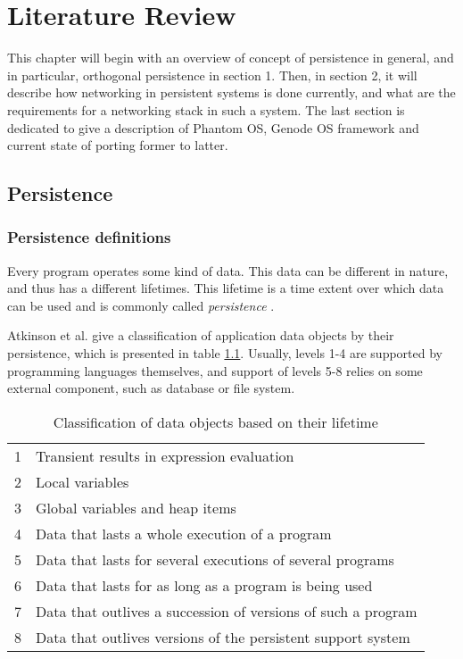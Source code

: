 \chapter{Literature Review}
\label{chap:lr}

This chapter will begin with an overview of concept of persistence in general,
and in particular, orthogonal persistence in section 1. Then, in section 2,
it will describe how networking in persistent systems is done currently, and what
are the requirements for a networking stack in such a system. The last section 
is dedicated to give a description of Phantom OS, Genode OS framework and 
current state of porting former to latter.

\section{Persistence}
\subsection{Persistence definitions}
Every program operates some kind of data. This data can be different in nature,
and thus has a different lifetimes. This lifetime is a time extent over which 
data can be used and is commonly called \textit{persistence} 
\cite{atkinson1983ps}. 

Atkinson et al. \cite{atkinson1995orthogonally,atkinson1983ps} give a 
classification of application data objects by their persistence, which is
presented in table \ref{tab:data_lifetimes}. Usually, levels 1-4 are supported
by programming languages themselves, and support of levels 5-8 relies on some 
external component, such as database or file system. 

\begin{longtable}{cl}
\caption[Classification of data objects based on their lifetime]{Classification 
of data objects based on their lifetime} 
\label{tab:data_lifetimes} \\
\hline
1 & Transient results in expression evaluation \\
2 & Local variables \\
3 & Global variables and heap items \\
4 & Data that lasts a whole execution of a program \\
5 & Data that lasts for several executions of several programs \\
6 & Data that lasts for as long as a program is being used \\
7 & Data that outlives a succession of versions of such a program \\
8 & Data that outlives versions of the persistent support system \\
\hline
\end{longtable}

